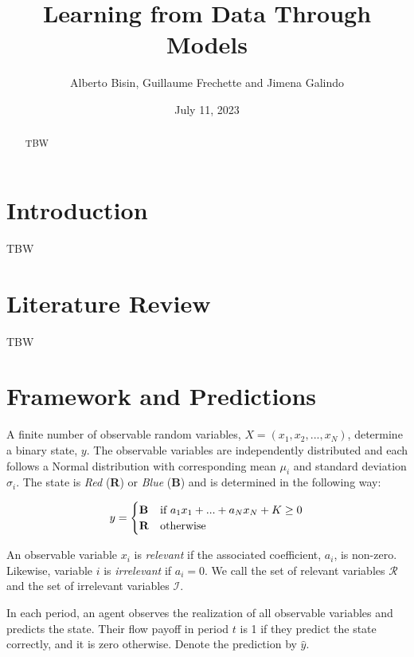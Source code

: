 \documentclass[
  12pt,
]{article}
\title{Learning from Data Through Models}
\author{Alberto Bisin, Guillaume Frechette and Jimena Galindo}
\date{July 11, 2023}
\begin{document}
\maketitle
\begin{abstract}
TBW
\end{abstract}

\hypertarget{introduction}{%
\section{Introduction}\label{introduction}}

TBW

\hypertarget{literature-review}{%
\section{Literature Review}\label{literature-review}}

TBW

\hypertarget{framework-and-predictions}{%
\section{Framework and Predictions}\label{framework-and-predictions}}

A finite number of observable random variables,
\(X =(x_1, x_2, ..., x_N)\), determine a binary state, \(y\). The
observable variables are independently distributed and each follows a
Normal distribution with corresponding mean \(\mu_i\) and standard
deviation \(\sigma_i\). The state is \emph{Red} (\textbf{R}) or
\emph{Blue} (\textbf{B}) and is determined in the following way:

\begin{equation*}
y = \begin{cases}
\text{\textbf{B}} &\text{if $a_1x_1+...+a_Nx_N + K\geq0$}\\
\text{\textbf{R}} &\text{otherwise}
\end{cases}
\end{equation*}

An observable variable \(x_i\) is \emph{relevant} if the associated
coefficient, \(a_i\), is non-zero. Likewise, variable \(i\) is
\emph{irrelevant} if \(a_i = 0\). We call the set of relevant variables
\(\mathcal{R}\) and the set of irrelevant variables \(\mathcal{I}\).

In each period, an agent observes the realization of all observable
variables and predicts the state. Their flow payoff in period \(t\) is 1
if they predict the state correctly, and it is zero otherwise. Denote
the prediction by \(\hat{y}\).
\end{document}
